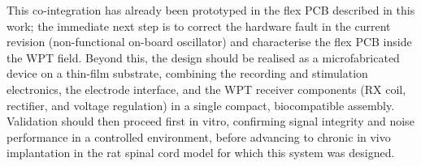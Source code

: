 This co-integration has already been prototyped in the flex PCB described in this
work; the immediate next step is to correct the hardware fault in the current revision
(non-functional on-board oscillator) and characterise the flex PCB inside the WPT
field. Beyond this, the design should be realised as a microfabricated device on a
thin-film substrate, combining the recording and stimulation electronics, the electrode
interface, and the WPT receiver components (RX coil, rectifier, and voltage regulation)
in a single compact, biocompatible assembly. Validation should then proceed first in
vitro, confirming signal integrity and noise performance in a controlled environment,
before advancing to chronic in vivo implantation in the rat spinal cord model for which
this system was designed.
